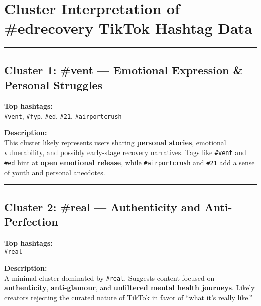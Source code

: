 \documentclass[
]{article}
\begin{document}
\section{Cluster Interpretation of \#edrecovery TikTok Hashtag
Data}\label{cluster-interpretation-of-edrecovery-tiktok-hashtag-data}

\begin{center}\rule{0.5\linewidth}{0.5pt}\end{center}

\subsection{\texorpdfstring{Cluster 1: \textbf{\#vent --- Emotional
Expression \& Personal
Struggles}}{Cluster 1: \#vent --- Emotional Expression \& Personal Struggles}}\label{cluster-1-vent-emotional-expression-personal-struggles}

\textbf{Top hashtags:}\\
\texttt{\#vent}, \texttt{\#fyp}, \texttt{\#ed}, \texttt{\#21},
\texttt{\#airportcrush}

\textbf{Description:}\\
This cluster likely represents users sharing \textbf{personal stories},
emotional vulnerability, and possibly early-stage recovery narratives.
Tags like \texttt{\#vent} and \texttt{\#ed} hint at \textbf{open
emotional release}, while \texttt{\#airportcrush} and \texttt{\#21} add
a sense of youth and personal anecdotes.

\begin{center}\rule{0.5\linewidth}{0.5pt}\end{center}

\subsection{\texorpdfstring{Cluster 2: \textbf{\#real --- Authenticity
and
Anti-Perfection}}{Cluster 2: \#real --- Authenticity and Anti-Perfection}}\label{cluster-2-real-authenticity-and-anti-perfection}

\textbf{Top hashtags:}\\
\texttt{\#real}

\textbf{Description:}\\
A minimal cluster dominated by \texttt{\#real}. Suggests content focused
on \textbf{authenticity}, \textbf{anti-glamour}, and \textbf{unfiltered
mental health journeys}. Likely creators rejecting the curated nature of
TikTok in favor of ``what it's really like.''
\end{document}
